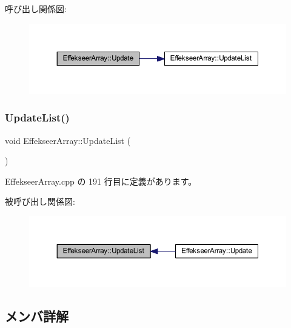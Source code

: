 呼び出し関係図\+:\nopagebreak
\begin{figure}[H]
\begin{center}
\leavevmode
\includegraphics[width=350pt]{class_effekseer_array_a41fcca7eb106c1c83851eca1284800f4_cgraph}
\end{center}
\end{figure}
\mbox{\label{class_effekseer_array_a39f6631cc74add5fe2193998df78ec1e}} 
\subsubsection{\texorpdfstring{Update\+List()}{UpdateList()}}
{\footnotesize\ttfamily void Effekseer\+Array\+::\+Update\+List (\begin{DoxyParamCaption}{ }\end{DoxyParamCaption})\hspace{0.3cm}{\ttfamily [private]}}



 Effekseer\+Array.\+cpp の 191 行目に定義があります。

被呼び出し関係図\+:\nopagebreak
\begin{figure}[H]
\begin{center}
\leavevmode
\includegraphics[width=350pt]{class_effekseer_array_a39f6631cc74add5fe2193998df78ec1e_icgraph}
\end{center}
\end{figure}


\subsection{メンバ詳解}
\mbox{\label{class_effekseer_array_a60c93a372a378026ae115faa3bbc5a2d}} 
